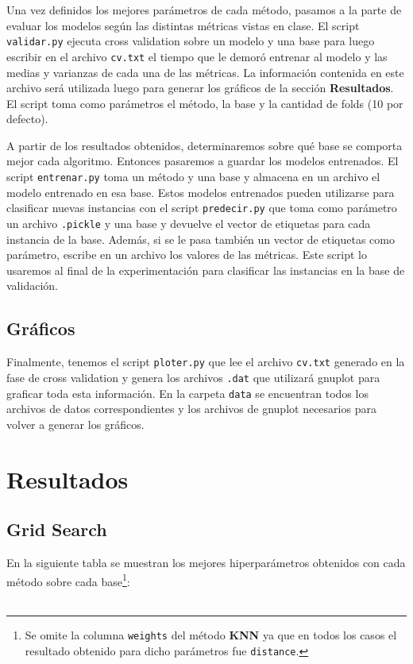 \documentclass[10pt, a4paper]{article}
\begin{document}
Una vez definidos los mejores parámetros de cada método, pasamos a la parte de evaluar los modelos según las distintas métricas vistas en clase. El script \texttt{validar.py} ejecuta cross validation sobre un modelo y una base para luego escribir en el archivo \texttt{cv.txt} el tiempo que le demoró entrenar al modelo y las medias y varianzas de cada una de las métricas. La información contenida en este archivo será utilizada luego para generar los gráficos de la sección \textbf{Resultados}. El script toma como parámetros el método, la base y la cantidad de folds (10 por defecto).

A partir de los resultados obtenidos, determinaremos sobre qué base se comporta mejor cada algoritmo. Entonces pasaremos a guardar los modelos entrenados. El script \texttt{entrenar.py} toma un método y una base y almacena en un archivo el modelo entrenado en esa base. Estos modelos entrenados pueden utilizarse para clasificar nuevas instancias con el script \texttt{predecir.py} que toma como parámetro un archivo \texttt{.pickle} y una base y devuelve el vector de etiquetas para cada instancia de la base. Además, si se le pasa también un vector de etiquetas como parámetro, escribe en un archivo los valores de las métricas. Este script lo usaremos al final de la experimentación para clasificar las instancias en la base de validación.

\subsection{Gráficos}

Finalmente, tenemos el script \texttt{ploter.py} que lee el archivo \texttt{cv.txt} generado en la fase de cross validation y genera los archivos \texttt{.dat} que utilizará gnuplot para graficar toda esta información. En la carpeta \texttt{data} se encuentran todos los archivos de datos correspondientes y los archivos de gnuplot necesarios para volver a generar los gráficos.

\section{Resultados}

\subsection{Grid Search}
En la siguiente tabla se muestran los mejores hiperparámetros obtenidos con cada método sobre cada base\footnote{Se omite la columna \texttt{weights} del método \textbf{KNN} ya que en todos los casos el resultado obtenido para dicho parámetros fue \texttt{distance}.}:\\\\
\end{document}
